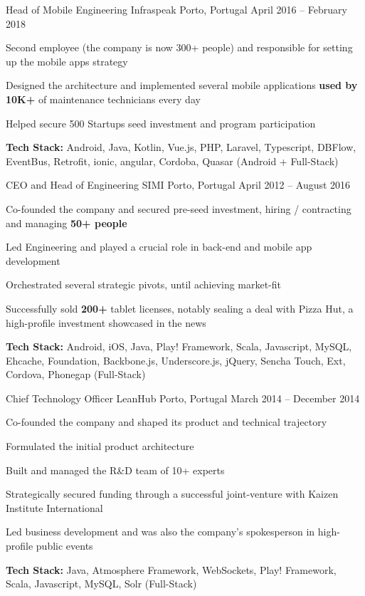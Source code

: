 \documentclass[]{awesome-cv}
\begin{document}
\begin{cventries}
	\vspace{-4mm}
	\cventry
	{Head of Mobile Engineering}
	{Infraspeak}
	{Porto, Portugal}
	{April 2016 – February 2018}
	{\begin{cvitems}
		\item {Second employee (the company is now 300+ people) and responsible for setting up the mobile apps strategy}
		\item {Designed the architecture and implemented several mobile applications \textbf{used by 10K+} of maintenance technicians every day}
		\item {Helped secure 500 Startups seed investment and program participation}
		\item {\textbf{Tech Stack:} Android, Java, Kotlin, Vue.js, PHP, Laravel, Typescript, DBFlow, EventBus, Retrofit, ionic, angular, Cordoba, Quasar (Android + Full-Stack)}
		\end{cvitems}}

	\vspace{-4mm}
	\cventry
	{CEO and Head of Engineering}
	{SIMI}
	{Porto, Portugal}
	{April 2012 – August 2016}
	{\begin{cvitems}
		\item {Co-founded the company and secured pre-seed investment, hiring / contracting and managing \textbf{50+ people}}
		\item {Led Engineering and played a crucial role in back-end and mobile app development}
		\item {Orchestrated several strategic pivots, until achieving market-fit}
		\item {Successfully sold \textbf{200+} tablet licenses, notably sealing a deal with Pizza Hut, a high-profile investment showcased in the news}
		\item {\textbf{Tech Stack:} Android, iOS, Java, Play! Framework, Scala, Javascript, MySQL, Ehcache, Foundation, Backbone.js, Underscore.js, jQuery, Sencha Touch, Ext, Cordova, Phonegap (Full-Stack)}
		\end{cvitems}}

	\vspace{-4mm}
	\cventry
	{Chief Technology Officer}
	{LeanHub}
	{Porto, Portugal}
	{March 2014 – December 2014}
	{\begin{cvitems}
		\item {Co-founded the company and shaped its product and technical trajectory}
		\item {Formulated the initial product architecture}
		\item {Built and managed the R\&D team of 10+ experts}
		\item {Strategically secured funding through a successful joint-venture with Kaizen Institute International}
		\item {Led business development and was also the company's spokesperson in high-profile public events}
		\item {\textbf{Tech Stack:} Java, Atmosphere Framework, WebSockets, Play! Framework, Scala, Javascript, MySQL, Solr (Full-Stack)}
		\end{cvitems}}


\end{cventries}
\end{document}
